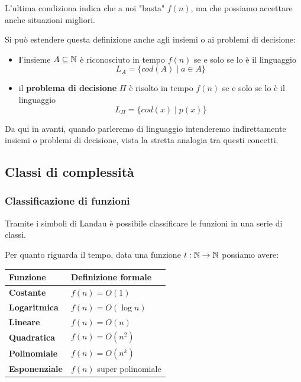 L'ultima condiziona indica che a noi "basta" $f(n)$, ma che possiamo accettare anche situazioni migliori.

Si può estendere questa definizione anche agli insiemi o ai problemi di decisione:
\begin{itemize}
	\item \textbf l'{insieme} $A \subseteq \mathbb{N}$ è riconosciuto in tempo $f(n)$ se e solo se lo è il linguaggio
	$$ L_A = \{cod (A) \mid a \in A \} $$
	\item il \textbf{problema di decisione} $\Pi$ è risolto in tempo $f(n)$ se e solo se lo è il linguaggio 
	$$ L_\Pi = \{cod(x) \mid p(x) \} $$
\end{itemize}

Da qui in avanti, quando parleremo di linguaggio intenderemo indirettamente insiemi o problemi di decisione, vista la stretta analogia tra questi concetti.

\subsection{Classi di complessità}

\subsubsection{Classificazione di funzioni}

Tramite i simboli di Landau è possibile classificare le funzioni in una serie di classi.

Per quanto riguarda il tempo, data una funzione $t: \mathbb{N} \rightarrow \mathbb{N}$ possiamo avere: 
\begin{center}
	\centering
	\renewcommand{\arraystretch}{1.8}
	\begin{tabular}{| C{100000000000em} | C{100000000000000000em} |}
		\hline
		\textbf{Funzione} & \textbf{Definizione formale} \\
		\hline
		\textbf{Costante} & $f(n) = O(1)$ \\
		\hline
		\textbf{Logaritmica} & $f(n) = O(\log n)$ \\
		\hline
		\textbf{Lineare} & $f(n) = O(n)$ \\
		\hline
	  \textbf{Quadratica} & $f(n)
							= O(n^2)$ \\
		\hline
		\textbf{Polinomiale} & $f(n) = O(n^k)$ \\
		\hline
		\textbf{Esponenziale} & $f(n)$ super polinomiale  \\
		\hline
	\end{tabular}
\end{center}

